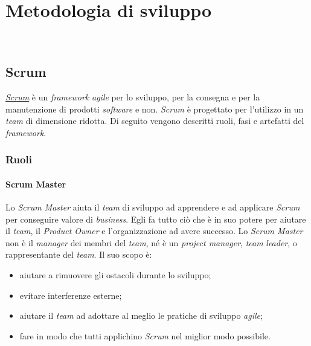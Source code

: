 
\chapter{Metodologia di sviluppo}
\label{cap:metodologia-lavoro}

\\

\section{Scrum}
\label{sez:scrum}
\href{https://www.scrum.org/about}{\textit{Scrum}} è un \textit{framework} \textit{agile} per lo sviluppo, per la consegna e per la manutenzione di prodotti \textit{software} e non.
\textit{Scrum} è progettato per l'utilizzo in un \textit{team} di dimensione ridotta. 
Di seguito vengono descritti ruoli, fasi e artefatti del \textit{framework}.

\subsection{Ruoli}

\subsubsection{Scrum Master}
Lo \textit{Scrum Master} aiuta il \textit{team} di sviluppo ad apprendere e ad applicare \textit{Scrum} per conseguire valore di \textit{business}. Egli fa tutto ciò che è in suo potere per aiutare il \textit{team}, il \textit{Product Owner} e l'organizzazione ad avere successo. Lo \textit{Scrum Master} non è il \textit{manager} dei membri del \textit{team}, né è un \textit{project manager}, \textit{team} \textit{leader}, o rappresentante del \textit{team}.
Il suo scopo è:
\begin{itemize}
    \item aiutare a rimuovere gli ostacoli durante lo sviluppo;
    \item evitare interferenze esterne;
    \item aiutare il \textit{team} ad adottare al meglio le pratiche di sviluppo \textit{agile};
    \item fare in modo che tutti applichino \textit{Scrum} nel miglior modo possibile.
\end{itemize}

